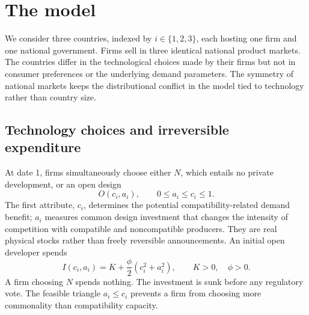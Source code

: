 \section{The model}\label{sec:model}

We consider three countries, indexed by \(i\in\{1,2,3\}\), each hosting one firm and one national government. Firms sell in three identical national product markets. The countries differ in the technological choices made by their firms but not in consumer preferences or the underlying demand parameters. The symmetry of national markets keeps the distributional conflict in the model tied to technology rather than country size.

\subsection{Technology choices and irreversible expenditure}\label{subsec:technology}

At date 1, firms simultaneously choose either \(N\), which entails no private development, or an open design
\begin{equation}
 O(c_i,a_i),\qquad 0\leq a_i\leq c_i\leq 1.
 \label{eq:action}
\end{equation}
The first attribute, \(c_i\), determines the potential compatibility-related demand benefit; \(a_i\) measures common design investment that changes the intensity of competition with compatible and noncompatible producers. They are real physical stocks rather than freely reversible announcements. An initial open developer spends
\begin{equation}
 I(c_i,a_i)=K+\frac{\phi}{2}(c_i^2+a_i^2),
 \qquad K>0,\quad \phi>0.
 \label{eq:initial-investment}
\end{equation}
A firm choosing \(N\) spends nothing. The investment is sunk before any regulatory vote. The feasible triangle \(a_i\leq c_i\) prevents a firm from choosing more commonality than compatibility capacity.

